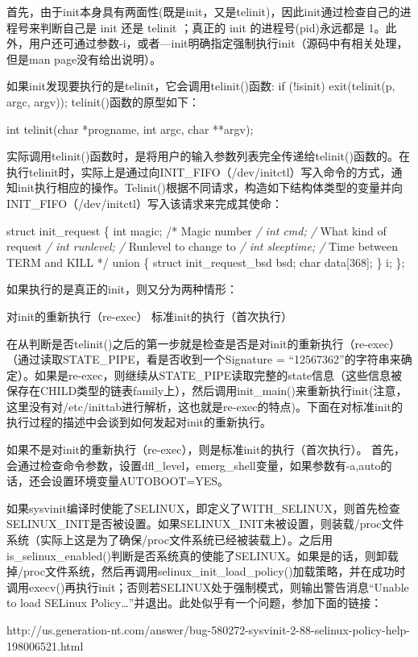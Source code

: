 首先，由于init本身具有两面性(既是init，又是telinit)，因此init通过检查自己的进程号来判断自己是
init 还是 telinit ；真正的 init 的进程号(pid)永远都是
1。此外，用户还可通过参数-i，或者---init明确指定强制执行init（源码中有相关处理，但是man
page没有给出说明）。

如果init发现要执行的是telinit，它会调用telinit()函数: if (!isinit)
exit(telinit(p, argc, argv)); telinit()函数的原型如下：

int telinit(char *progname, int argc, char **argv);

实际调用telinit()函数时，是将用户的输入参数列表完全传递给telinit()函数的。在执行telinit时，实际上是通过向INIT\_FIFO（/dev/initctl）写入命令的方式，通知init执行相应的操作。Telinit()根据不同请求，构造如下结构体类型的变量并向INIT\_FIFO（/dev/initctl）写入该请求来完成其使命：

struct init\_request \{ int magic; /* Magic number \emph{/ int cmd; /}
What kind of request \emph{/ int runlevel; /} Runlevel to change to
\emph{/ int sleeptime; /} Time between TERM and KILL */ union \{ struct
init\_request\_bsd bsd; char data{[}368{]}; \} i; \};

如果执行的是真正的init，则又分为两种情形：

对init的重新执行（re-exec） 标准init的执行（首次执行）

在从判断是否telinit()之后的第一步就是检查是否是对init的重新执行（re-exec）（通过读取STATE\_PIPE，看是否收到一个Signature
=
``12567362''的字符串来确定）。如果是re-exec，则继续从STATE\_PIPE读取完整的state信息（这些信息被保存在CHILD类型的链表family上），然后调用init\_main()来重新执行init(注意，这里没有对/etc/inittab进行解析，这也就是re-exec的特点)。下面在对标准init的执行过程的描述中会谈到如何发起对init的重新执行。

如果不是对init的重新执行（re-exec），则是标准init的执行（首次执行）。
首先，会通过检查命令参数，设置dfl\_level，emerg\_shell变量，如果参数有-a,auto的话，还会设置环境变量AUTOBOOT=YES。

如果sysvinit编译时使能了SELINUX，即定义了WITH\_SELINUX，则首先检查SELINUX\_INIT是否被设置。如果SELINUX\_INIT未被设置，则装载/proc文件系统（实际上这是为了确保/proc文件系统已经被装载上）。之后用is\_selinux\_enabled()判断是否系统真的使能了SELINUX。如果是的话，则卸载掉/proc文件系统，然后再调用selinux\_init\_load\_policy()加载策略，并在成功时调用execv()再执行init；否则若SELINUX处于强制模式，则输出警告消息``Unable
to load SELinux
Policy\ldots{}''并退出。此处似乎有一个问题，参加下面的链接：

http://us.generation-nt.com/answer/bug-580272-sysvinit-2-88-selinux-policy-help-198006521.html

